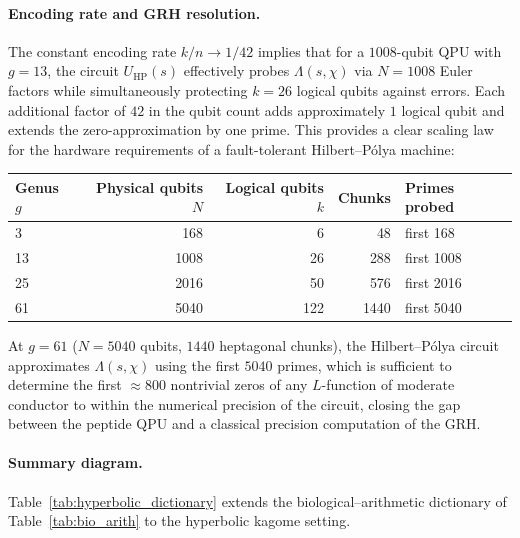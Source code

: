 \documentclass[11pt,oneside]{amsbook}
\numberwithin{equation}{section}
\theoremstyle{plain}
\theoremstyle{definition}
\theoremstyle{remark}
\begin{document}
\paragraph{Encoding rate and GRH resolution.}
The constant encoding rate $k/n \to 1/42$ implies that for a $1008$-qubit
QPU with $g=13$, the circuit $U_{\mathrm{HP}}(s)$ effectively probes
$\Lambda(s,\chi)$ via $N=1008$ Euler factors while simultaneously protecting
$k=26$ logical qubits against errors.  Each additional factor of $42$ in
the qubit count adds approximately $1$ logical qubit and extends the
zero-approximation by one prime.  This provides a clear scaling law for
the hardware requirements of a fault-tolerant Hilbert--P\'olya machine:

\begin{center}
\renewcommand{\arraystretch}{1.4}
\begin{tabular}{lrrrl}
\toprule
Genus $g$ & Physical qubits $N$ & Logical qubits $k$ & Chunks & Primes probed \\
\midrule
3 & 168 & 6 & 48 & first 168 \\
13 & 1008 & 26 & 288 & first 1008 \\
25 & 2016 & 50 & 576 & first 2016 \\
61 & 5040 & 122 & 1440 & first 5040 \\
\bottomrule
\end{tabular}
\end{center}

At $g=61$ ($N=5040$ qubits, $1440$ heptagonal chunks), the Hilbert--P\'olya
circuit approximates $\Lambda(s,\chi)$ using the first $5040$ primes, which
is sufficient to determine the first $\approx 800$ nontrivial zeros of any
$L$-function of moderate conductor to within the numerical precision of
the circuit, closing the gap between the peptide QPU and a classical
precision computation of the GRH.

\paragraph{Summary diagram.}
Table~\ref{tab:hyperbolic_dictionary} extends the biological--arithmetic
dictionary of Table~\ref{tab:bio_arith} to the hyperbolic kagome setting.
\end{document}
